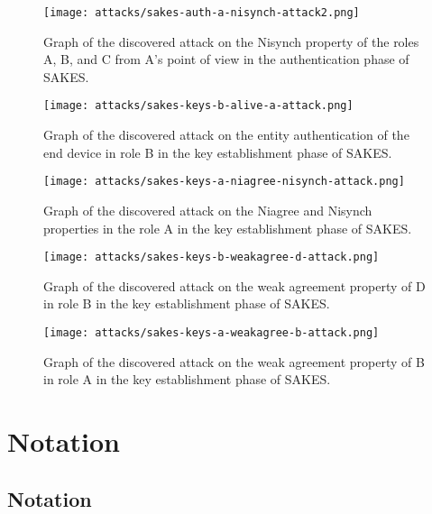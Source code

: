 \begin{sidewaysfigure}
	\centering
	\texttt{[image: attacks/sakes-auth-a-nisynch-attack2.png]}
	\caption{Graph of the discovered attack on the Nisynch property of the roles A, B, and C from A's point of view in the authentication phase of SAKES.}
	\label{fig:sakes-attack-nisynch}
\end{sidewaysfigure}

\begin{sidewaysfigure}
	\centering
	\texttt{[image: attacks/sakes-keys-b-alive-a-attack.png]}
	\caption{Graph of the discovered attack on the entity authentication of the end device in role B in the key establishment phase of SAKES.}
	\label{fig:sakes-attack-keys-b-alive-a}
\end{sidewaysfigure}

\begin{sidewaysfigure}
	\centering
	\texttt{[image: attacks/sakes-keys-a-niagree-nisynch-attack.png]}
	\caption{Graph of the discovered attack on the Niagree and Nisynch properties in the role A in the key establishment phase of SAKES.}
	\label{fig:sakes-attack-keys-a-niagree-nisynch}
\end{sidewaysfigure}

\begin{sidewaysfigure}
	\centering
	\texttt{[image: attacks/sakes-keys-b-weakagree-d-attack.png]}
	\caption{Graph of the discovered attack on the weak agreement property of D in role B in the key establishment phase of SAKES.}
	\label{fig:sakes-attack-keys-b-weakagree-d}
\end{sidewaysfigure}

\begin{sidewaysfigure}
	\centering
	\texttt{[image: attacks/sakes-keys-a-weakagree-b-attack.png]}
	\caption{Graph of the discovered attack on the weak agreement property of B in role A in the key establishment phase of SAKES.}
	\label{fig:sakes-attack-keys-a-weakagree-b}
\end{sidewaysfigure}


\chapter{Notation}

\section{Notation}
\label{app:notations}

